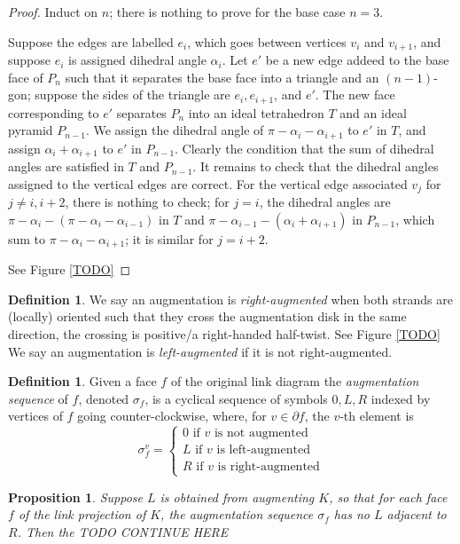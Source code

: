 \documentclass[11pt]{amsart}
\theoremstyle{plain}
\newtheorem{prop}[theorem]{Proposition}
\theoremstyle{definition}
\newtheorem{define}[theorem]{Definition}
\begin{document}
\begin{proof}
Induct on $n$; there is nothing to prove for the base case $n=3$.

Suppose the edges are labelled $e_i$,
which goes between vertices $v_i$ and $v_{i+1}$,
and suppose $e_i$ is assigned dihedral angle $\alpha_i$.
Let $e'$ be a new edge addeed to the base face of $P_n$
such that it separates the base face into a triangle and
an $(n-1)$-gon;
suppose the sides of the triangle are
$e_i, e_{i+1}$, and $e'$.
The new face corresponding to $e'$ separates $P_n$ into
an ideal tetrahedron $T$ and an ideal pyramid $P_{n-1}$.
We assign the dihedral angle of $\pi - \alpha_i - \alpha_{i+1}$
to $e'$ in $T$, and assign $\alpha_i + \alpha_{i+1}$ to $e'$ in $P_{n-1}$.
Clearly the condition that the sum of dihedral angles are satisfied
in $T$ and $P_{n-1}$.
It remains to check that the dihedral angles assigned to the vertical edges
are correct.
For the vertical edge associated $v_j$ for $j \neq i, i+2$,
there is nothing to check;
for $j = i$, the dihedral angles are
$\pi - \alpha_i - (\pi - \alpha_i - \alpha_{i-1})$
in $T$ and $\pi - \alpha_{i-1} - (\alpha_i + \alpha_{i+1})$ in $P_{n-1}$,
which sum to $\pi - \alpha_i - \alpha_{i+1}$;
it is similar for $j = i+2$.

See Figure \ref{TODO}
\end{proof}

\begin{define}
We say an augmentation is \emph{right-augmented} when both strands are (locally) oriented such that they cross the augmentation disk in the same direction, the crossing is positive/a right-handed half-twist. See Figure \ref{TODO}
We say an augmentation is \emph{left-augmented} if it is not right-augmented.
\end{define}

\begin{define}
Given a face $f$ of the original link diagram the \emph{augmentation sequence}
of $f$, denoted $\sigma_f$, is a cyclical sequence of symbols $0, L, R$ indexed
by vertices of $f$ going counter-clockwise, where, for $v \in \partial f$, the
$v$-th element is
\[
\sigma_f^v = 
\begin{cases}
0 \text{ if $v$ is not augmented} \\
L \text{ if $v$ is left-augmented} \\
R \text{ if $v$ is right-augmented}
\end{cases}
\]
\end{define}

\begin{prop}
Suppose $L$ is obtained from augmenting $K$,
so that for each face $f$ of the link projection of $K$,
the augmentation sequence $\sigma_f$ has no $L$ adjacent to $R$.
Then the TODO CONTINUE HERE
\end{prop}
\end{document}
